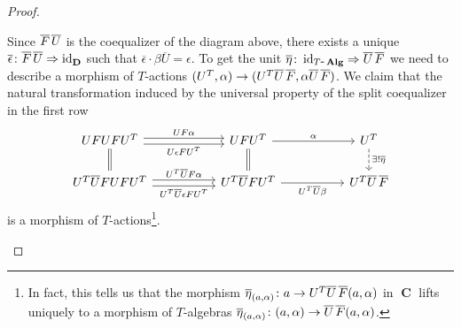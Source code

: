 \documentclass[a4paper,11pt,twoside, openany]{book}
\DeclareMathOperator{\Alg}{\mathbf{Alg}}
\DeclareMathOperator{\C}{\mathbf{C}}
\DeclareMathOperator{\D}{\mathbf{D}}
\DeclareMathOperator{\id}{id}
\theoremstyle{definition}
\theoremstyle{definition}
\theoremstyle{remark}
\begin{document}
\begin{proof}
\begin{enumerate}
\[			\]
			Since $\overline{F}\hspace{.5mm}\overline{U}$ is the coequalizer of the diagram above, there exists a unique $\overline{\epsilon}\colon\overline{F}\hspace{.5mm}\overline{U}\Rightarrow\id_{\D}$ such that $\overline{\epsilon}\cdot\beta\overline{U}=\epsilon$. To get the unit $\overline{\eta}\colon\id_{T\mbox{-}\Alg}\Rightarrow\overline{U}\hspace{.5mm}\overline{F}$ we need to describe a morphism of $T$-actions $(U^T,\alpha)\to(U^T\overline{U}\hspace{.5mm}\overline{F},\alpha\overline{U}\hspace{.5mm}\overline{F})$. We claim that the natural transformation induced by the universal property of the split coequalizer in the first row
			\[
			\begin{tikzcd}[column sep=1.8cm]
			UFUFU^T\arrow[r, shift left, "UF\alpha"] \arrow[r, shift right, "U\epsilon FU^T"']\arrow[d, equal]	& UFU^T\arrow[r, "\alpha"] \arrow[d, equal] & U^T \arrow[d, dashed, "\exists!\overline{\eta}"]\\
			U^T\overline{U}FUFU^T\arrow[r, shift left,  "U^T\overline{U}F\alpha"] \arrow[r, shift right, "U^T\overline{U}\epsilon FU^T"']&U^T\overline{U}FU^T\arrow[r, "U^T\overline{U}\beta"']& U^T\overline{U}\hspace{.5mm}\overline{F}
			\end{tikzcd}
			\]
			is a morphism of $T$-actions\footnote{In fact, this tells us that the morphism $\overline{\eta}_{(a,\alpha)}\colon a\to U^T\overline{U}\hspace{.5mm}\overline{F}(a,\alpha)$ in $\C$ lifts uniquely to a morphism of $T$-algebras $\overline{\eta}_{(a,\alpha)}\colon(a,\alpha)\to\overline{U}\hspace{.5mm}\overline{F}(a,\alpha)$.}. 
			

\end{enumerate}
\end{proof}
\end{document}
